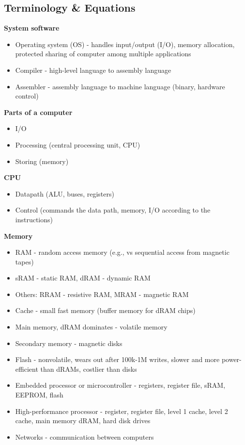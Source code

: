 \subsection*{Terminology & Equations}

\textbf{System software}

\begin{itemize}
\item Operating system (OS) - handles input/output (I/O), memory allocation, protected sharing of computer among multiple applications
\item Compiler - high-level language to assembly language
\item Assembler - assembly language to machine language (binary, hardware control)
\end{itemize}

\textbf{Parts of a computer}

\begin{itemize}
\item I/O
\item Processing (central processing unit, CPU)
\item Storing (memory)
\end{itemize}

\textbf{CPU}

\begin{itemize}
\item Datapath (ALU, buses, registers)
\item Control (commands the data path, memory, I/O according to the instructions)
\end{itemize}

\textbf{Memory}

\begin{itemize}
\item RAM - random access memory (e.g., vs sequential access from magnetic tapes)
\item sRAM - static RAM, dRAM - dynamic RAM
\item Others: RRAM - resistive RAM, MRAM - magnetic RAM
\item Cache - small fast memory (buffer memory for dRAM chips)
\item Main memory, dRAM dominates - volatile memory
\item Secondary memory - magnetic disks
\item Flash - nonvolatile, wears out after 100k-1M writes, slower and more power-efficient than dRAMs, costlier than disks
\item Embedded processor or microcontroller - registers, register file, sRAM, EEPROM, flash
\item High-performance processor - register, register file, level 1 cache, level 2 cache, main memory dRAM, hard disk drives
\item Networks - communication between computers
\end{itemize}